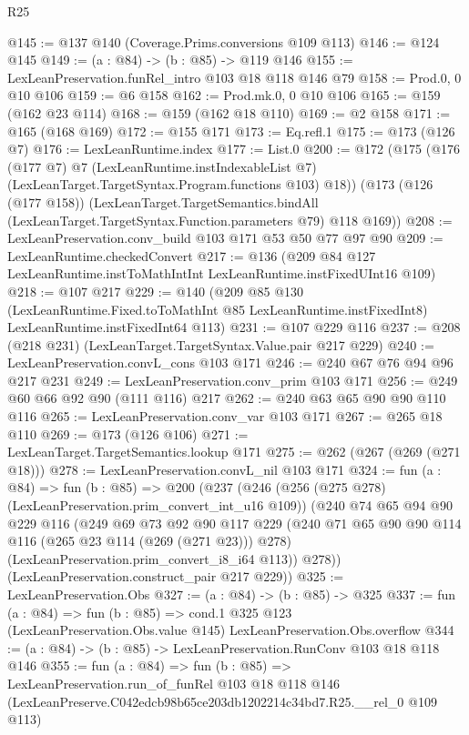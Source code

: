 \begin{lexlean}{R25}
\begin{coremodule}
@145 := @137 @140 (Coverage.Prims.conversions @109 @113)
@146 := @124 @145
@149 := (a : @84) -> (b : @85) -> @119 @146
@155 := LexLeanPreservation.funRel_intro @103 @18 @118 @146 @79
@158 := Prod.{0, 0} @10 @106
@159 := @6 @158
@162 := Prod.mk.{0, 0} @10 @106
@165 := @159 (@162 @23 @114)
@168 := @159 (@162 @18 @110)
@169 := @2 @158
@171 := @165 (@168 @169)
@172 := @155 @171
@173 := Eq.refl.{1}
@175 := @173 (@126 @7)
@176 := LexLeanRuntime.index
@177 := List.{0}
@200 := @172
    (@175
      (@176
        (@177 @7)
        @7
        (LexLeanRuntime.instIndexableList @7)
        (LexLeanTarget.TargetSyntax.Program.functions @103)
        @18))
    (@173
      (@126 (@177 @158))
      (LexLeanTarget.TargetSemantics.bindAll
        (LexLeanTarget.TargetSyntax.Function.parameters @79)
        @118
        @169))
@208 := LexLeanPreservation.conv_build @103 @171 @53 @50 @77 @97 @90
@209 := LexLeanRuntime.checkedConvert
@217 := @136 (@209 @84 @127 LexLeanRuntime.instToMathIntInt LexLeanRuntime.instFixedUInt16 @109)
@218 := @107 @217
@229 := @140
    (@209
      @85
      @130
      (LexLeanRuntime.Fixed.toToMathInt @85 LexLeanRuntime.instFixedInt8)
      LexLeanRuntime.instFixedInt64
      @113)
@231 := @107 @229 @116
@237 := @208 (@218 @231) (LexLeanTarget.TargetSyntax.Value.pair @217 @229)
@240 := LexLeanPreservation.convL_cons @103 @171
@246 := @240 @67 @76 @94 @96 @217 @231
@249 := LexLeanPreservation.conv_prim @103 @171
@256 := @249 @60 @66 @92 @90 (@111 @116) @217
@262 := @240 @63 @65 @90 @90 @110 @116
@265 := LexLeanPreservation.conv_var @103 @171
@267 := @265 @18 @110
@269 := @173 (@126 @106)
@271 := LexLeanTarget.TargetSemantics.lookup @171
@275 := @262 (@267 (@269 (@271 @18)))
@278 := LexLeanPreservation.convL_nil @103 @171
@324 := fun (a : @84) =>
  fun (b : @85) =>
  @200
    (@237
      (@246
        (@256 (@275 @278) (LexLeanPreservation.prim_convert_int_u16 @109))
        (@240
          @74
          @65
          @94
          @90
          @229
          @116
          (@249
            @69
            @73
            @92
            @90
            @117
            @229
            (@240 @71 @65 @90 @90 @114 @116 (@265 @23 @114 (@269 (@271 @23))) @278)
            (LexLeanPreservation.prim_convert_i8_i64 @113))
          @278))
      (LexLeanPreservation.construct_pair @217 @229))
@325 := LexLeanPreservation.Obs
@327 := (a : @84) -> (b : @85) -> @325
@337 := fun (a : @84) =>
  fun (b : @85) =>
  cond.{1} @325 @123 (LexLeanPreservation.Obs.value @145) LexLeanPreservation.Obs.overflow
@344 := (a : @84) -> (b : @85) -> LexLeanPreservation.RunConv @103 @18 @118 @146
@355 := fun (a : @84) =>
  fun (b : @85) =>
  LexLeanPreservation.run_of_funRel
    @103
    @18
    @118
    @146
    (LexLeanPreserve.C042edcb98b65ce203db1202214c34bd7.R25.__rel_0 @109 @113)
\end{coremodule}
\end{lexlean}
